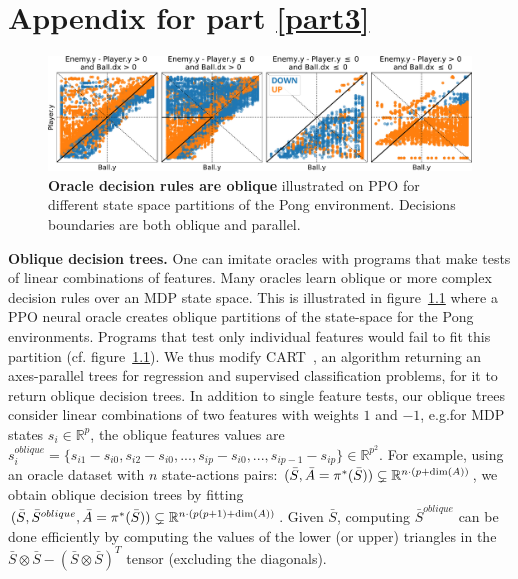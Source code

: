 \chapter{Appendix for part \ref{part3}}
\label{chap-app-imit}
\begin{figure}[b]
    \centering
    \includegraphics[width=1.\textwidth]{images/images_part3/pong_state_space.pdf}
    \caption{\textbf{Oracle decision rules are oblique} illustrated on PPO for different state space partitions of the Pong environment. Decisions boundaries are both oblique and parallel.}
    \label{fig:pong_states}
\end{figure}

\textbf{Oblique decision trees.} One can imitate oracles with programs that make tests of linear combinations of features. Many oracles learn oblique or more complex decision rules over an MDP state space. This is illustrated in figure~\ref{fig:pong_states} where a PPO neural oracle creates oblique partitions of the state-space for the Pong environments. Programs that test only individual features would fail to fit this partition (cf. figure~\ref{fig:pong_states}). 
We thus modify CART~\cite{breiman1984classification}, an algorithm returning an axes-parallel trees for regression and supervised classification problems, for it to return oblique decision trees. 
In addition to single feature tests, our oblique trees consider linear combinations of two features with weights $1$ and $-1$, e.g.\@ for MDP states $s_i \in \mathbb{R}^{p}$, the oblique features values are $s^{oblique}_i = \{s_{i1} - s_{i0}, s_{i2} - s_{i0}, ..., s_{ip} - s_{i0}, ...,s_{ip-1} - s_{ip}\} \in \mathbb{R}^{p^2}$. For example, using an oracle dataset with $n$ state-actions pairs: $(\bar{S}, \Bar{A} = \pi^{*}(\bar{S})) \subsetneq \mathbb{R}^{n\cdot(p+\dim(A))}$, we obtain oblique decision trees by fitting $(\bar{S},\bar{S}^{oblique} , \Bar{A} = \pi^{*}(\bar{S})) \subsetneq \mathbb{R}^{n\cdot(p(p+1)+\dim(A))}$. 
Given $\bar{S}$, computing $\bar{S}^{oblique}$ can be done efficiently by computing the values of the lower (or upper) triangles in the $\bar{S} \otimes \bar{S} - (\bar{S} \otimes \bar{S})^T$ tensor (excluding the diagonals).


